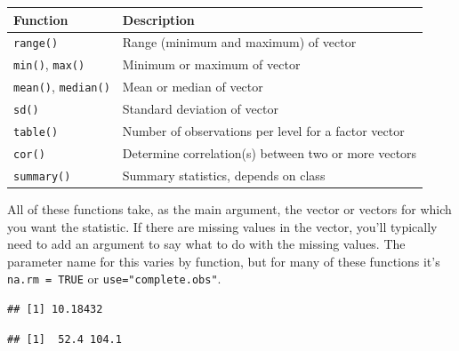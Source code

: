 \documentclass[]{book}
\makeatletter
\newenvironment{Shaded}{\begin{snugshade}}{\end{snugshade}}
\newcommand{\KeywordTok}[1]{\textcolor[rgb]{0.13,0.29,0.53}{\textbf{{#1}}}}
\newcommand{\DataTypeTok}[1]{\textcolor[rgb]{0.13,0.29,0.53}{{#1}}}
\newcommand{\OtherTok}[1]{\textcolor[rgb]{0.56,0.35,0.01}{{#1}}}
\newcommand{\NormalTok}[1]{{#1}}
\newenvironment{kframe}{%
\medskip{}
\setlength{\fboxsep}{.8em}
 \def\at@end@of@kframe{}%
 \ifinner\ifhmode%
  \def\at@end@of@kframe{\end{minipage}}%
  \begin{minipage}{\columnwidth}%
 \fi\fi%
 \def\FrameCommand##1{\hskip\@totalleftmargin \hskip-\fboxsep
 \colorbox{shadecolor}{##1}\hskip-\fboxsep
     \hskip-\linewidth \hskip-\@totalleftmargin \hskip\columnwidth}%
 \MakeFramed {\advance\hsize-\width
   \@totalleftmargin\z@ \linewidth\hsize
   \@setminipage}}%
 {\par\unskip\endMakeFramed%
 \at@end@of@kframe}
\renewenvironment{Shaded}{\begin{kframe}}{\end{kframe}}
\makeatother
\begin{document}
\begin{longtable}[c]{@{}ll@{}}
\toprule
Function & Description\tabularnewline
\midrule
\endhead
\texttt{range()} & Range (minimum and maximum) of vector\tabularnewline
\texttt{min()}, \texttt{max()} & Minimum or maximum of
vector\tabularnewline
\texttt{mean()}, \texttt{median()} & Mean or median of
vector\tabularnewline
\texttt{sd()} & Standard deviation of vector\tabularnewline
\texttt{table()} & Number of observations per level for a factor
vector\tabularnewline
\texttt{cor()} & Determine correlation(s) between two or more
vectors\tabularnewline
\texttt{summary()} & Summary statistics, depends on class\tabularnewline
\bottomrule
\end{longtable}

All of these functions take, as the main argument, the vector or vectors
for which you want the statistic. If there are missing values in the
vector, you'll typically need to add an argument to say what to do with
the missing values. The parameter name for this varies by function, but
for many of these functions it's \texttt{na.rm\ =\ TRUE} or
\texttt{use="complete.obs"}.

\begin{Shaded}
\end{Shaded}

\begin{verbatim}
## [1] 10.18432
\end{verbatim}

\begin{Shaded}
\end{Shaded}

\begin{verbatim}
## [1]  52.4 104.1
\end{verbatim}

\begin{Shaded}
\end{Shaded}
\end{document}
